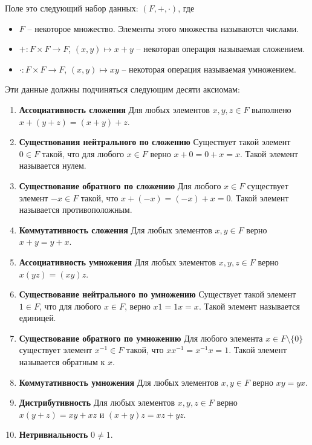 \begin{definition}
[Поле]
\label{def::Field}
Поле это следующий набор данных: $(F, + , \cdot)$, где
\begin{itemize}
\item $F$ -- некоторое множество.
Элементы этого множества называются числами.

\item $+\colon F\times F\to F$, $(x,y)\mapsto x+y$ -- некоторая операция называемая сложением.

\item $\cdot\colon F\times F\to F$, $(x,y)\mapsto xy$ -- некоторая операция называемая умножением.
\end{itemize}
Эти данные должны подчиняться следующим десяти аксиомам:
\begin{enumerate}
\item {\bf Ассоциативность сложения}
Для любых элементов $x,y,z\in F$ выполнено $x+(y+z) = (x+y)+z$.

\item {\bf Существования нейтрального по сложению}
Существует такой элемент $0\in F$ такой, что для любого $x\in F$ верно $x + 0 = 0 + x = x$.
Такой элемент называется нулем.

\item {\bf Существование обратного по сложению}
Для любого $x\in F$ существует элемент $-x\in F$ такой, что $x + (-x) = (-x) + x = 0$.
Такой элемент называется противоположным.

\item {\bf Коммутативность сложения}
Для любых элементов $x,y\in F$ верно $x+y = y+x$.

\item {\bf Ассоциативность умножения}
Для любых элементов $x,y,z\in F$ верно $x(yz) = (xy)z$.

\item {\bf Существование нейтрального по умножению}
Существует такой элемент $1\in F$, что для любого $x\in F$, верно $x 1 = 1 x = x$.
Такой элемент называется единицей.

\item {\bf Существование обратного по умножению}
Для любого элемента $x\in F\setminus\{0\}$ существует элемент $x^{-1}\in F$ такой, что $x x^{-1} = x^{-1}x = 1$.
Такой элемент называется обратным к $x$.

\item {\bf Коммутативность умножения}
Для любых элементов $x,y\in F$ верно $xy = yx$.

\item {\bf Дистрибутивность}
Для любых элементов $x,y,z\in F$ верно $x(y+z) = xy + xz$ и $(x+y)z = xz + yz$.

\item {\bf Нетривиальность}
$0\neq 1$.
\end{enumerate}
\end{definition}

